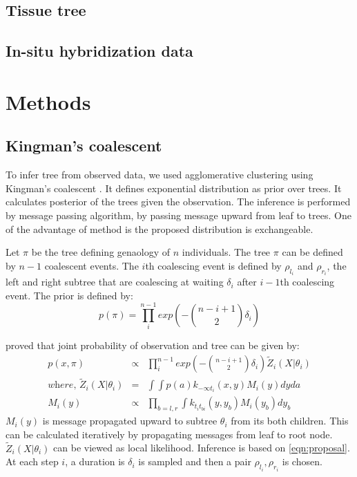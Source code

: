 \documentclass{article}
\begin{document}
\subsection{Tissue tree}
\subsection{In-situ hybridization data}

\section{Methods}

\subsection{Kingman's coalescent}
To infer tree from observed data, we used agglomerative clustering using Kingman's coalescent \cite{teh2008bayesian}.
It defines exponential distribution as prior over trees.  It calculates posterior of the trees given the observation.
The inference is performed by message passing algorithm, by passing message upward from leaf to trees. One of the advantage of
method is the proposed distribution is exchangeable.

Let $\pi$ be the tree defining genaology of $n$ individuals. The tree $\pi$ can be defined by $n-1$ coalescent events. 
The $i$th coalescing event is defined by $\rho_{l_i}$ and $\rho_{r_i}$, the left and right subtree that are coalescing  
at waiting $\delta_i$ after $i-1$th coalescing event. The prior is defined by:
\begin{equation}
	p(\pi) = \prod_{i}^{n-1}exp\left( -\binom{n-i +1}{2}\delta_i \right)
	\label{ref:prior}
\end{equation}


\cite{teh2008bayesian} proved that joint probability of observation and tree can be given by:
\begin{eqnarray}
	p(x, \pi) &\propto& \prod_{i}^{n-1}exp\left( -\binom{n-i +1}{2}\delta_i \right) \tilde{Z}_{i}(X|\theta_i) \\ 
	\textit{where, } \tilde{Z}_{i}(X|\theta_i) & =& \int \int p(a) k_{- \infty t_{i}} (x,y) M_{i}(y) dy da \\ 
	M_i(y) &\propto& \prod_{b=l,r} \int k_{t_i t_{bi}}(y,y_b) M_i(y_b) dy_b 
	\label{eqn:proposal}
\end{eqnarray}
$M_i(y)$ is message propagated upward to subtree $\theta_i$ from its both children. This can be calculated iteratively
by propagating messages from leaf to root node. $\tilde{Z}_{i}(X|\theta_i)$ can be viewed as local likelihood. Inference
is based on \ref{eqn:proposal}. At each step $i$, a duration is $\delta_i$ is sampled and then a pair $\rho_{l_i},\rho_{r_i}$
is chosen.
\end{document}
